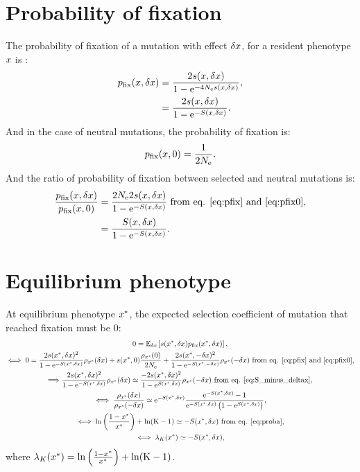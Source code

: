 \documentclass{article}
\begin{document}
\section*{Probability of fixation}
The probability of fixation of a mutation with effect $\delta x$, for a resident phenotype $x$ is :
\begin{align}
p_{\text{fix}}(x, \delta x) &= \frac{ 2 s(x, \delta x)}{1 - \mathrm{e}^{-4N_{\mathrm{e}} s(x, \delta x)}}, \\
 &= \frac{ 2 s(x, \delta x)}{1 - \mathrm{e}^{-S(x, \delta x)}}. \label{eq:pfix}
\end{align}
And in the case of neutral mutations, the probability of fixation is:
\begin{gather}
p_{\text{fix}}(x, 0) = \frac{ 1}{2 N_{\mathrm{e}}} \label{eq:pfix0}.
\end{gather}
And the ratio of probability of fixation between selected and neutral mutations is:
\begin{align}
\frac{p_{\text{fix}}(x, \delta x)}{p_{\text{fix}}(x, 0)} & = \frac{ 2 N_{\mathrm{e}} 2 s(x, \delta x)}{1 - \mathrm{e}^{-S(x, \delta x)}} \text{ from eq. \ref{eq:pfix} and \ref{eq:pfix0}},\\
& = \frac{S(x, \delta x)}{1 - \mathrm{e}^{-S(x, \delta x)}} \label{eq:pfixratio}.
\end{align}
\section*{Equilibrium phenotype}
At equilibrium phenotype $x^{*}$, the expected selection coefficient of mutation that reached fixation must be $0$:
\begin{gather}
 0 = \operatorname{\mathbb{E}}_{\delta x} \left[ s(x^{*}, \delta x) p_{\text{fix}}(x^{*}, \delta x) \right], \\
\iff 0 = \frac{ 2 s(x^{*}, \delta x)^2}{1 - \mathrm{e}^{-S(x^{*}, \delta x)}}   \rho_{x^{*}}(\delta x) + s(x^{*}, 0) \frac{ \rho_{x^{*}}(0)}{2N_{\mathrm{e}}} + \frac{ 2s(x^{*}, -\delta x)^2}{1 - \mathrm{e}^{-S(x^{*}, -\delta x)}} \rho_{x^{*}}(-\delta x)\text{ from eq. \ref{eq:pfix} and \ref{eq:pfix0}}, \\
\Longrightarrow \frac{ 2s(x^{*}, \delta x)^2}{1 - \mathrm{e}^{-S(x^{*}, \delta x)}}   \rho_{x^{*}}(\delta x) \simeq \frac{ - 2s(x^{*}, \delta x)^2}{1 - \mathrm{e}^{S(x^{*}, \delta x)}}   \rho_{x^{*}}(-\delta x) \text{ from eq. \ref{eq:S_minus_deltax}}, \\
\iff \frac{ \rho_{x^{*}}(\delta x)}{\rho_{x^{*}}(-\delta x)} \simeq \mathrm{e}^{-S(x^{*}, \delta x)} \frac{ \mathrm{e}^{-S(x^{*}, \delta x)} - 1}{ \mathrm{e}^{-S(x^{*}, \delta x)} \left( 1 - \mathrm{e}^{S(x^{*}, \delta x)} \right)}, \\
\iff \ln \left( \frac{1 - x^{*}}{x^{*}} \right) + \ln (\text{K}-1) \simeq -S(x^{*}, \delta x) \text{ from eq. \ref{eq:proba}} \label{eq:equilibrium}, \\
\iff \lambda_{K}(x^{*}) \simeq -S(x^{*}, \delta x) \label{eq:equilibrium_lambda},
\end{gather}
where  $\lambda_{K}(x^{*}) = \ln \left( \frac{1 - x^{*}}{x^{*}} \right) + \ln (\text{K}-1)$.
\end{document}
